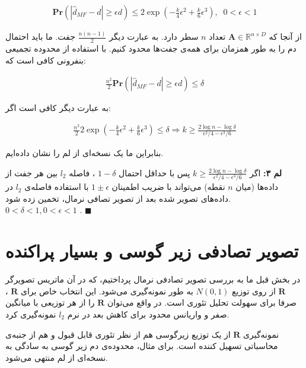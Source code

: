 \begin{align}
\mathbf{Pr} \left( \left| \hat{d}_{MF} - d \right| \geq \epsilon d \right) \leq 2 \exp \left( - \frac{k}{4} \epsilon^2 + \frac{k}{6} \epsilon^3 \right),\;\; 0 < \epsilon < 1
\label{eq:1iI}
\end{align}

از آنجا که 
$\mathbf{A} \in \mathbb{R}^{n \times D}$
تعداد 
$n$ 
سطر دارد. به عبارت دیگر 
$\frac{n(n-1)}{2}$
جفت. ما باید احتمال دم را به طور همزمان برای همه‌ی جفت‌ها محدود کنیم. با استفاده از محدوده تجمیعی بنفرونی%
کافی است که:

\begin{align}
\frac{n^2}{2} \mathbf{Pr} \left( \left| \hat{d}_{MF} - d \right| \geq \epsilon d \right) \leq \delta
\label{eq:1iJ}
\end{align}

به عبارت دیگر کافی است اگر:

\begin{align}
\frac{n^2}{2} 2 \exp \left( - \frac{k}{4} \epsilon^2 + \frac{k}{6} \epsilon^3 \right) \leq \delta 
\Rightarrow
k \geq \frac{2 \log n - \log \delta}{\epsilon^2 / 4 - \epsilon^3 / 6}
\label{eq:1iK}
\end{align}

بنابراین ما یک نسخه‌ای از لم 
را نشان داده‌ایم.

\textbf{
لم ۳:
}
اگر 
$k \geq \frac{2 \log n - \log \delta}{\epsilon^2 / 4 - \epsilon^3 / 6} $
پس با حداقل احتمال 
$1-\delta$
، فاصله 
$l_2$
بین هر جفت از داده‌ها (میان 
$n$
نقطه) می‌تواند با ضریب اطمینان
$1 \pm \epsilon$
با استفاده فاصله‌ی 
$l_2$
در داده‌های تصویر شده بعد از تصویر تصافی نرمال، تخمین زده شود.
$0 < \delta < 1, 0 < \epsilon < 1$
.
$\blacksquare$
\bigskip



\section{
تصویر تصادفی زیر گوسی و بسیار پراکنده
}

در بخش قبل ما به بررسی تصویر تصادفی نرمال پرداختیم، که در آن ماتریس تصویرگر 
$\mathbf{R}$
از روی توزیع 
$N(0,1)$
به طور 
نمونه‌گیری می‌شود. این انتخاب خاص برای 
$\mathbf{R}$
، صرفا برای سهولت تحلیل تئوری است. در واقع می‌توان 
$\mathbf{R}$
را از هر توزیعی با میانگین صفر و واریانس محدود برای کاهش بعد در نرم 
$l_2$
نمونه‌گیری کرد.

نمونه‌گیری
$\mathbf{R}$
از یک توزیع زیرگوسی%
هم از نظر تئوری قابل قبول و هم از جنبه‌ی محاسباتی تسهیل کننده است. برای مثال، محدوده‌ی دم زیر گوسی به سادگی به نسخه‌ای از لم
منتهی می‌شود. 

